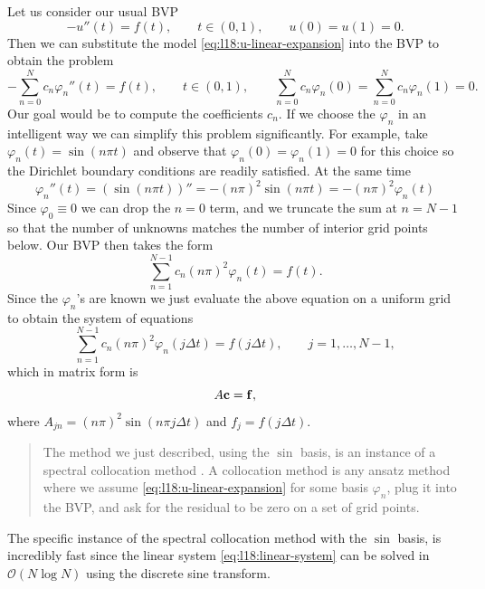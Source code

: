 Let us consider our usual BVP 
\begin{equation*}
    -u''(t)  = f(t), \qquad t \in (0,1), \qquad u(0) = u(1) =0. 
\end{equation*}
Then we can substitute the model \eqref{eq:l18:u-linear-expansion} into the BVP 
to obtain the problem 
\begin{equation*}
    - \sum_{n=0}^N c_n \varphi_n''(t) = f(t), \qquad t \in (0,1), \qquad \sum_{n=0}^N c_n \varphi_n(0) = \sum_{n=0}^N c_n \varphi_n(1) =0. 
\end{equation*}
Our goal would be to compute the coefficients $c_n$. 
If we choose the $\varphi_n$ in an intelligent way we can simplify this problem 
significantly. For example, take $\varphi_n(t) = \sin( n \pi t)$ and observe that 
$\varphi_n(0) = \varphi_n(1) = 0$ for this choice so the Dirichlet boundary 
conditions are readily satisfied. At the same time 
\begin{equation*}
    \varphi_n''(t) = (\sin(n \pi t ))'' = - (n\pi)^2 \sin(n \pi t) = - (n \pi)^2 \varphi_n(t) 
\end{equation*}
Since $\varphi_0 \equiv 0$ we can drop the $n=0$ term, and we truncate the sum at $n = N-1$
so that the number of unknowns matches the number of interior grid points below.
Our BVP then takes the form
\begin{equation*}
    \sum_{n=1}^{N-1} c_n (n \pi)^2 \varphi_n(t) = f(t). 
\end{equation*}
Since the $\varphi_n$'s are known we just evaluate the above equation on a 
uniform grid to obtain the system of equations 
\begin{equation*}
    \sum_{n=1}^{N-1} c_n (n \pi)^2 \varphi_n(j \Delta t) = f(j \Delta t), \qquad j = 1, \dots, N-1,
\end{equation*}
which in matrix form is 
\begin{equation}\label{eq:l18:linear-system}
    A \mathbf{c} = \mathbf{f}, 
\end{equation}
where $A_{jn}= (n \pi)^2 \sin( n \pi j \Delta t)$ and $f_j = f(j \Delta t)$. 

\begin{quote}
The method we just described, using the $\sin$ basis, is an 
instance of a spectral collocation method \cite{trefethen2000spectral}.
A collocation method is any ansatz method where we assume 
\eqref{eq:l18:u-linear-expansion} for some basis $\varphi_n$, 
plug it into the BVP, and ask for the residual to be zero on 
a set of grid points. 
\end{quote}

The specific instance of the spectral collocation method with 
the $\sin$ basis, is incredibly fast since the linear 
system \eqref{eq:l18:linear-system} can be solved in 
$\mathcal{O}(N \log N)$ using the discrete sine transform.




